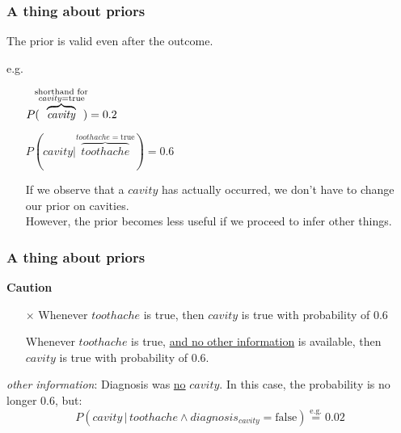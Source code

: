\begin{frame}\frametitle{A thing about priors}

The prior is valid even after the outcome.

e.g.\\
\begin{itemize}
 \item[] $P( \kern-1ex \overbrace{\mathit{cavity}}^{\substack{\text{shorthand for}\\{\mathit{cavity}}=\text{true}}} \kern-1ex) = 0.2$
 \item[] $P(\mathit{cavity} | \overbrace{\mathit{toothache}}^{{\mathit{toothache}}=\text{true}}) = 0.6$
 \item[] If we observe that a $\mathit{cavity}$ has actually occurred, we don't have to change our prior on cavities.\\
 However, the prior becomes less useful if we proceed to infer other things.
\end{itemize}


\end{frame}

\begin{frame}\frametitle{A thing about priors}

    
\textbf{Caution}\\
\begin{itemize}
\item[$\times$] Whenever $\mathit{toothache}$ is true, then $\mathit{cavity}$ is true with probability of 0.6
\item[\checkmark] Whenever $\mathit{toothache}$ is true, \underline{and no other information} is available, then $\mathit{cavity}$ is true with probability of 0.6.
\end{itemize}

\textit{other information}: Diagnosis was \underline{no} $\mathit{cavity}$. In this case, the probability is no longer 0.6, but:
\begin{equation}
P(\mathit{cavity} \,|\, \mathit{toothache} \wedge diagnosis_{\mathit{cavity}} = \text{false}) \stackrel{\text{e.g.}}{=} 0.02
\end{equation}

\end{frame}

